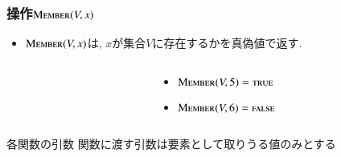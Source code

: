 \documentclass[main]{subfiles}
\begin{document}
\begin{frame}\frametitle{操作$\mathrm{\text{M\textsc{ember}}}(V,x)$}
\begin{itemize}
\item $\mathrm{\text{M\textsc{ember}}}(V,x)$は, $x$が集合$V$に存在するかを真偽値で返す.\\
\end{itemize}
\begin{columns}[c]
	\begin{column}{0.5\linewidth}
		
	\end{column}
	\begin{column}{0.49\linewidth}
		\begin{itemize}
			\item $\mathrm{\text{M\textsc{ember}}}(V,5) = \text{\textsc{true}}$\\
			\item $\mathrm{\text{M\textsc{ember}}}(V,6) = \text{\textsc{false}}$\\
		\end{itemize}
	\end{column}
\end{columns}
\begin{alertblock}{各関数の引数}
関数に渡す引数は要素として取りうる値のみとする
\end{alertblock}
\end{frame}
\end{document}
